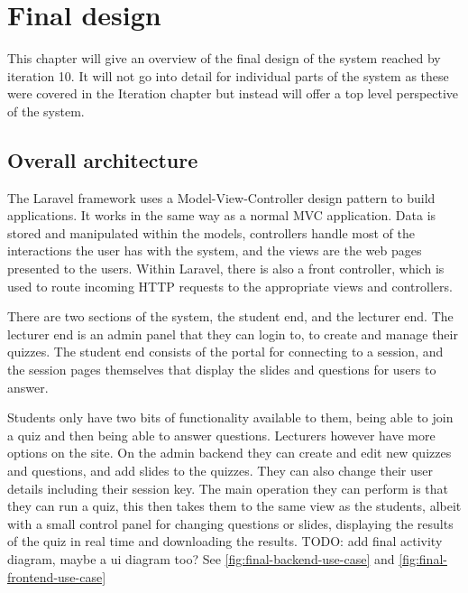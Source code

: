 \chapter{Final design}
This chapter will give an overview of the final design of the system reached by iteration 10. It will not go into detail for individual parts of the system as these were covered in the Iteration chapter but instead will offer a top level perspective of the system.

\section{Overall architecture}
The Laravel framework uses a Model-View-Controller design pattern\cite{mvc} to build applications. It works in the same way as a normal MVC application. Data is stored and manipulated within the models, controllers handle most of the interactions the user has with the system, and the views are the web pages presented to the users. Within Laravel, there is also a front controller, which is used to route incoming HTTP requests to the appropriate views and controllers\cite{Laravel-architechture}.

There are two sections of the system, the student end, and the lecturer end. The lecturer end is an admin panel that they can login to, to create and manage their quizzes. The student end consists of the portal for connecting to a session, and the session pages themselves that display the slides and questions for users to answer.

Students only have two bits of functionality available to  them, being able to join a quiz and then being able to answer questions. Lecturers however have more options on the site. On the admin backend they can create and edit new quizzes and questions, and add slides to the quizzes. They can also change their user details including their session key. The main operation they can perform is that they can run a quiz, this then takes them to the same view as the students, albeit with a small control panel for changing questions or slides, displaying the results of the quiz in real time and downloading the results. TODO: add final activity diagram, maybe a ui diagram too? See \ref{fig:final-backend-use-case} and \ref{fig:final-frontend-use-case}

